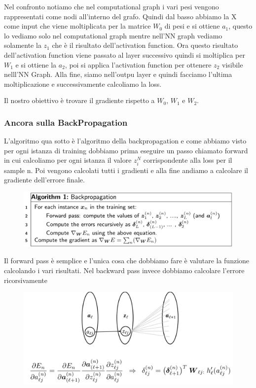 \documentclass[14pt]{extreport}
\begin{document}
Nel confronto notiamo che nel computational graph i vari pesi vengono rappresentati come nodi all'interno del grafo. Quindi dal basso abbiamo la X
come input che viene moltiplicata per la matrice $W_0$ di pesi e si ottiene $a_1$, questo lo vediamo solo nel computational graph mentre nell'NN graph
vediamo solamente la $z_1$ che è il risultato dell'activation function. Ora questo risultato dell'activation function viene passato al layer
successivo quindi si moltiplica per $W_1$ e si ottiene la $a_2$, poi si applica l'activation function per ottenere $z_2$ visibile nelll'NN Graph. Alla
fine, siamo nell'outpu layer e quindi facciamo l'ultima moltiplicazione e successivamente calcoliamo la loss.

Il nostro obiettivo è trovare il gradiente rispetto a $W_0$, $W_1$ e $W_2$.

\subsubsection{Ancora sulla BackPropagation}

L'algoritmo qua sotto è l'algoritmo della backpropagation e come abbiamo visto per ogni istanza di training dobbiamo prima eseguire un passo chiamato
forward in cui calcoliamo per ogni istanza il valore $z_i^N$ corrispondente alla loss per il sample n. Poi vengono calcolati tutti i gradienti e alla
fine andiamo a calcolare il gradiente dell'errore finale.

\begin{figure}[H]
\centering
\includegraphics[width=0.7\linewidth]{399.jpeg}
\end{figure}

Il forward pass è semplice e l'unica cosa che dobbiamo fare è valutare la funzione calcolando i vari risultati. Nel backward pass invece dobbiamo
calcolare l'errore ricorsivamente

\begin{figure}[H]
\centering
\includegraphics[width=0.7\linewidth]{400.jpeg}
\end{figure}
\end{document}

